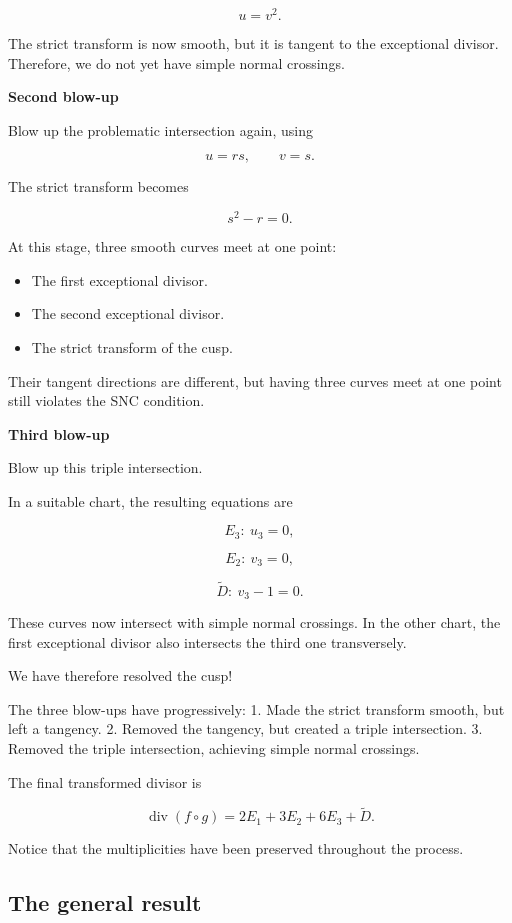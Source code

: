 \documentclass[12pt]{article}
\begin{document}
\[
u=v^2.
\]

The strict transform is now smooth, but it is tangent to the exceptional
divisor. Therefore, we do not yet have simple normal crossings.

\textbf{Second blow-up}

Blow up the problematic intersection again, using

\[
u=rs,\qquad v=s.
\]

The strict transform becomes

\[
s^2-r=0.
\]

At this stage, three smooth curves meet at one point:

\begin{itemize}
\item
  The first exceptional divisor.
\item
  The second exceptional divisor.
\item
  The strict transform of the cusp.
\end{itemize}

Their tangent directions are different, but having three curves meet at
one point still violates the SNC condition.

\textbf{Third blow-up}

Blow up this triple intersection.

In a suitable chart, the resulting equations are

\[
E_3:\ u_3=0,
\]

\[
E_2:\ v_3=0,
\]

\[
\widetilde D:\ v_3-1=0.
\]

These curves now intersect with simple normal crossings. In the other
chart, the first exceptional divisor also intersects the third one
transversely.

We have therefore resolved the cusp!

The three blow-ups have progressively: 1. Made the strict transform
smooth, but left a tangency. 2. Removed the tangency, but created a
triple intersection. 3. Removed the triple intersection, achieving
simple normal crossings.

The final transformed divisor is

\[
\boxed{
\operatorname{div}(f\circ g)
=2E_1+3E_2+6E_3+\widetilde D.
}
\]

Notice that the multiplicities have been preserved throughout the
process.

\subsection{The general result}\label{the-general-result}
\end{document}
